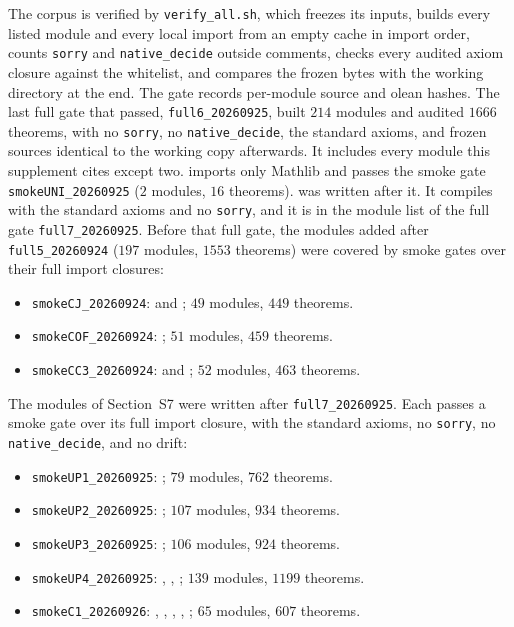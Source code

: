 The corpus is verified by \texttt{verify\_all.sh}, which freezes its inputs, builds every
listed module and every local import from an empty cache in import order, counts
\texttt{sorry} and \texttt{native\_decide} outside comments, checks every audited axiom
closure against the whitelist, and compares the frozen bytes with the working directory at
the end. The gate records per-module source and olean hashes. The last full gate that passed,
\texttt{full6\_20260925}, built $214$ modules and audited $1666$ theorems, with no
\texttt{sorry}, no \texttt{native\_decide}, the standard axioms, and frozen sources identical to
the working copy afterwards. It includes every module this supplement cites except two.
 imports only Mathlib and passes the smoke gate
\texttt{smokeUNI\_20260925} ($2$ modules, $16$ theorems).  was
written after it. It compiles with the standard axioms and no \texttt{sorry}, and it is in the
module list of the full gate \texttt{full7\_20260925}. Before that full gate, the modules
added after \texttt{full5\_20260924} ($197$ modules, $1553$ theorems) were covered by smoke gates
over their full import closures:
\begin{itemize}
\item \texttt{smokeCJ\_20260924}:  and
; $49$ modules, $449$ theorems.
\item \texttt{smokeCOF\_20260924}: ; $51$ modules, $459$
theorems.
\item \texttt{smokeCC3\_20260924}:  and
; $52$ modules, $463$ theorems.
\end{itemize}
The modules of Section~S7 were written after \texttt{full7\_20260925}. Each passes a smoke gate
over its full import closure, with the standard axioms, no \texttt{sorry}, no
\texttt{native\_decide}, and no drift:
\begin{itemize}
\item \texttt{smokeUP1\_20260925}: ; $79$ modules, $762$ theorems.
\item \texttt{smokeUP2\_20260925}: ; $107$ modules, $934$ theorems.
\item \texttt{smokeUP3\_20260925}: ; $106$ modules, $924$ theorems.
\item \texttt{smokeUP4\_20260925}: , ,
; $139$ modules, $1199$ theorems.
\item \texttt{smokeC1\_20260926}: , ,
, , ;
$65$ modules, $607$ theorems.
\end{itemize}


